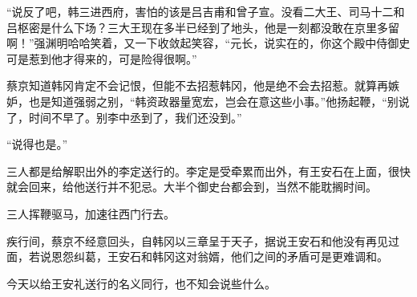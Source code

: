 “说反了吧，韩三进西府，害怕的该是吕吉甫和曾子宣。没看二大王、司马十二和吕枢密是什么下场？三大王现在多半已经到了地头，他是一刻都没敢在京里多留啊！”强渊明哈哈笑着，又一下收敛起笑容，“元长，说实在的，你这个殿中侍御史可是惹到他才得来的，可是险得很啊。”

蔡京知道韩冈肯定不会记恨，但能不去招惹韩冈，他是绝不会去招惹。就算再嫉妒，也是知道强弱之别，“韩资政器量宽宏，岂会在意这些小事。”他扬起鞭，“别说了，时间不早了。别李中丞到了，我们还没到。”

“说得也是。”

三人都是给解职出外的李定送行的。李定是受牵累而出外，有王安石在上面，很快就会回来，给他送行并不犯忌。大半个御史台都会到，当然不能耽搁时间。

三人挥鞭驱马，加速往西门行去。

疾行间，蔡京不经意回头，自韩冈以三章呈于天子，据说王安石和他没有再见过面，若说恩怨纠葛，王安石和韩冈这对翁婿，他们之间的矛盾可是更难调和。

今天以给王安礼送行的名义同行，也不知会说些什么。


